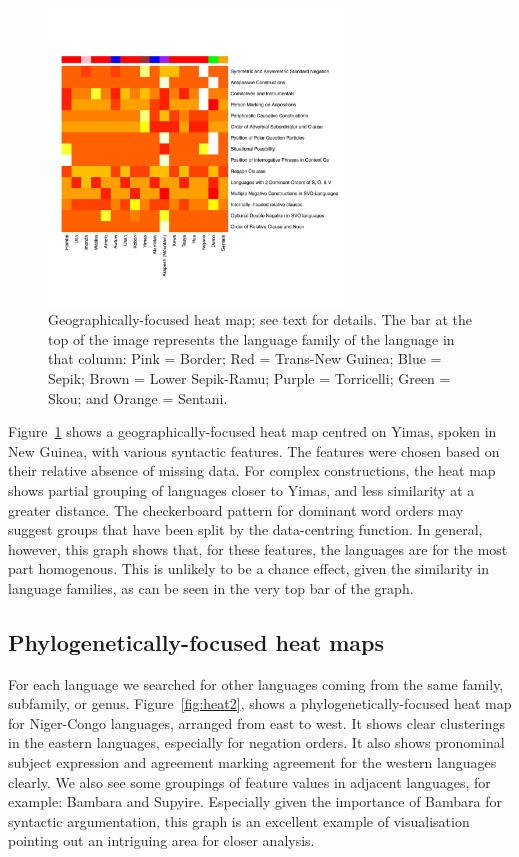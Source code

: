 \documentclass[11pt]{article}
\begin{document}
\begin{figure}[!b]
\includegraphics[width=3.1in]
{graph2yimassmall.pdf} 
\caption{Geographically-focused heat map; see text for details. The bar at the top of the image represents the language family of the language in that column: Pink = Border; Red = Trans-New Guinea; Blue = Sepik; Brown = Lower Sepik-Ramu; Purple = Torricelli; Green = Skou; and Orange = Sentani.} 
\label{fig:heat1} 

\end{figure}

Figure~\ref{fig:heat1} shows a geographically-focused heat map centred on Yimas, spoken in New Guinea, with various syntactic features. The features were chosen based on their relative absence of missing data. For complex constructions, the heat map shows partial grouping of languages closer to Yimas, and less similarity at a greater distance. The checkerboard pattern for dominant word orders may suggest groups that have been split by the data-centring function. In general, however, this graph shows that, for these features, the languages are for the most part homogenous. This is unlikely to be a chance effect, given the similarity in language families, as can be seen in the very top bar of the graph.

\subsection{Phylogenetically-focused heat maps}

For each language we searched for other languages coming from the same family, subfamily, or genus. Figure~\ref{fig:heat2}, shows a phylogenetically-focused heat map for Niger-Congo languages, arranged from east to west. It shows clear clusterings in the eastern languages, especially for negation orders. It also shows pronominal subject expression and agreement marking agreement for the western languages clearly. We also see some groupings of feature values in adjacent languages, for example: Bambara and Supyire. Especially given the importance of Bambara for syntactic argumentation\cite{culy}, this graph is an excellent example of visualisation pointing out an intriguing area for closer analysis.
\end{document}
